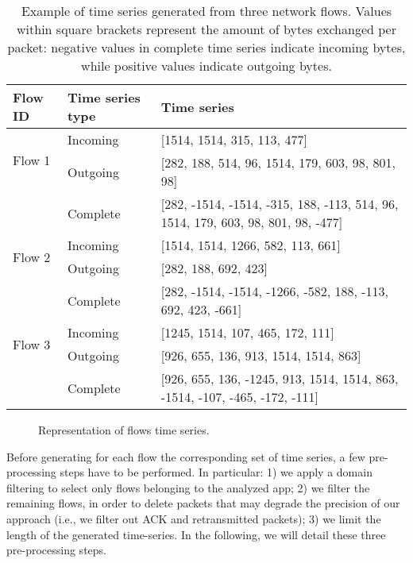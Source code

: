 \documentclass{acm_proc_article-sp}
\begin{document}
\begin{table*}[ht!]
       \centering
        \begin{center}
\begin{tabular}[t]{|l|l|l|}\hline
\textbf{Flow ID} & \textbf{Time series type} & \textbf{Time series}\\\hline
\multirow{2}{*}{Flow 1} & Incoming & [1514, 1514, 315, 113, 477]\\
 & Outgoing & [282, 188, 514, 96, 1514, 179, 603, 98, 801, 98]\\
 & Complete & [282, -1514, -1514, -315, 188, -113, 514, 96, 1514, 179, 603, 98, 801, 98, -477]\\\hline
 \multirow{2}{*}{Flow 2} & Incoming & [1514, 1514, 1266, 582, 113, 661]
\\
 & Outgoing & [282, 188, 692, 423]\\
 & Complete & [282, -1514, -1514, -1266, -582, 188, -113, 692, 423, -661]
\\\hline
  \multirow{2}{*}{Flow 3} & Incoming & [1245, 1514, 107, 465, 172, 111]
\\
 & Outgoing & [926, 655, 136, 913, 1514, 1514, 863]
\\
 & Complete & [926, 655, 136, -1245, 913, 1514, 1514, 863, -1514, -107, -465, -172, -111]
\\\hline
        \end{tabular}
        \end{center}
\caption{Example of time series generated from three network flows. Values within square brackets
represent the amount of bytes exchanged per packet: negative values in complete time series indicate incoming bytes,
while positive values indicate outgoing bytes.}
\label{tab:exampleOfTS}
\end{table*}    



\begin{figure} [h!]
       \centering
    \caption{Representation of flows time series.}
    \label{fig:fbflowsoverlap}  
\end{figure}



Before generating for each flow the corresponding set of time series, 
a few pre-processing steps have to be 
performed. In particular: 1) we apply a domain filtering to select only flows belonging to the analyzed 
app; 2) we filter the remaining flows, in order to delete packets that 
may degrade the precision of our approach (i.e., we filter out ACK and retransmitted 
packets); 3) we limit the length of the generated time-series.
In the following, we will detail these three pre-processing steps.
\end{document}
